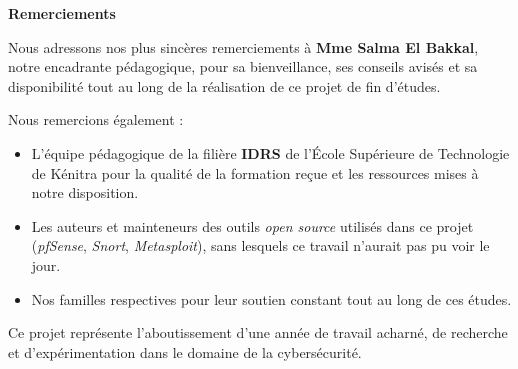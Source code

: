 \documentclass[12pt,a4paper,openany]{report}
\newif\ifshowpagenumbers
\newcommand{\hidepagenumbers}{\showpagenumbersfalse\pagestyle{empty}}
\newcommand{\showpagenumbers}{\showpagenumberstrue\pagestyle{fancy}}
\begin{document}
	\newpage
	\thispagestyle{plain}
	
	\vspace*{2cm}
	
	\begin{center}
		{\Large\bfseries\color{primary}Remerciements}
	\end{center}
	
	\vspace{1.5cm}
	
	Nous adressons nos plus sincères remerciements à \textbf{Mme Salma El Bakkal}, notre encadrante pédagogique, pour sa bienveillance, ses conseils avisés et sa disponibilité tout au long de la réalisation de ce projet de fin d'études.
	
	Nous remercions également :
	
	\begin{itemize}[leftmargin=*]
		\item L'équipe pédagogique de la filière \textbf{IDRS} de l'École Supérieure de Technologie de Kénitra pour la qualité de la formation reçue et les ressources mises à notre disposition.
		
		\item Les auteurs et mainteneurs des outils \textit{open source} utilisés dans ce projet (\textit{pfSense}, \textit{Snort}, \textit{Metasploit}), sans lesquels ce travail n'aurait pas pu voir le jour.
		
		\item Nos familles respectives pour leur soutien constant tout au long de ces études.
	\end{itemize}
	
	\vspace{2cm}
	
	\noindent
	Ce projet représente l'aboutissement d'une année de travail acharné, de recherche et d'expérimentation dans le domaine de la cybersécurité.
	
	\hidepagenumbers
	
	\newpage
	\tableofcontents
	
	\newpage
	\listoffigures
	
	\newpage
	\listoftables
	
	\cleardoublepage
	\showpagenumbers
	\setcounter{page}{1}
	
\end{document}
